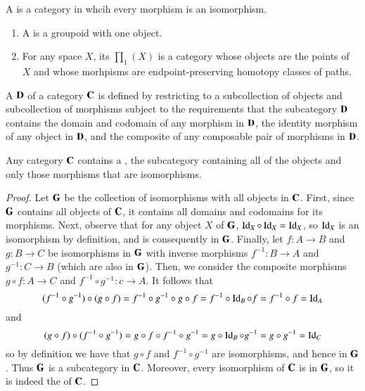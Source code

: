 \begin{definition}
    A  is a category in whcih every morphism is an isomorphism.
\end{definition}

\begin{definition}
    \leavevmode
    \begin{enumerate}
        \item A  is a groupoid with one object.
        \item For any space $X$, its  $\prod_1(X)$ is a category whose objects are the points of $X$ and whose morhpisms are endpoint-preserving homotopy classes of paths.
    \end{enumerate}
\end{definition}

\begin{definition}
    A  $\normalfont\textbf{D}$ of a category $\normalfont\textbf{C}$ is defined by restricting to a subcollection of objects and subcollection of morphisms subject to the requirements that the subcategory $\normalfont\textbf{D}$ contains the domain and codomain of any morphism in $\normalfont\textbf{D}$, the identity morphism of any object in $\normalfont\textbf{D}$, and the composite of any composable pair of morphisms in $\normalfont\textbf{D}$.
\end{definition}


\begin{lemma}
    Any category $\normalfont\textbf{C}$ contains a , the subcategory containing all of the objects and only those morphisms that are isomorphisms.
\end{lemma}
\begin{proof}
    Let $\normalfont\textbf{G}$ be the collection of isomorphisms with all objects in $\normalfont\textbf{C}$. First, since $\normalfont\textbf{G}$ contains all objects of $\normalfont\textbf{C}$, it contains all domains and codomains for its morphisms. Next, observe that for any object $X$ of $\normalfont\textbf{G}$, $\operatorname{Id}_X\circ \operatorname{Id}_X = \operatorname{Id}_X$, so $\operatorname{Id}_X$ is an isomorphism by definition, and is consequently in $\normalfont\textbf{G}$. Finally, let $f:A\rightarrow B$ and $g:B\rightarrow C$ be isomorphisms in $\normalfont\textbf{G}$ with inverse morphisms $f^{-1}:B\rightarrow A$ and $g^{-1}:C\rightarrow B$ (which are also in $\normalfont\textbf{G}$). Then, we consider the composite morphisms $g\circ f:A\rightarrow C$ and $f^{-1}\circ g^{-1}:c\rightarrow A$. It follows that \begin{equation*}
        (f^{-1}\circ g^{-1})\circ(g\circ f) = f^{-1}\circ g^{-1}\circ g\circ f = f^{-1}\circ \operatorname{Id}_B\circ f = f^{-1}\circ f = \operatorname{Id}_A
    \end{equation*}
    and \begin{equation*}
        (g\circ f)\circ (f^{-1}\circ g^{-1}) = g\circ f\circ f^{-1}\circ g^{-1} = g\circ \operatorname{Id}_B\circ g^{-1} = g\circ g^{-1} = \operatorname{Id}_C
    \end{equation*}
    so by definition we have that $g\circ f$ and $f^{-1}\circ g^{-1}$ are isomorphisms, and hence in $\normalfont\textbf{G}$. Thus $\normalfont\textbf{G}$ is a subcategory in $\normalfont\textbf{C}$. Moreover, every isomorphism of $\normalfont\textbf{C}$ is in $\normalfont\textbf{G}$, so it is indeed the  of $\normalfont\textbf{C}$.
\end{proof}


